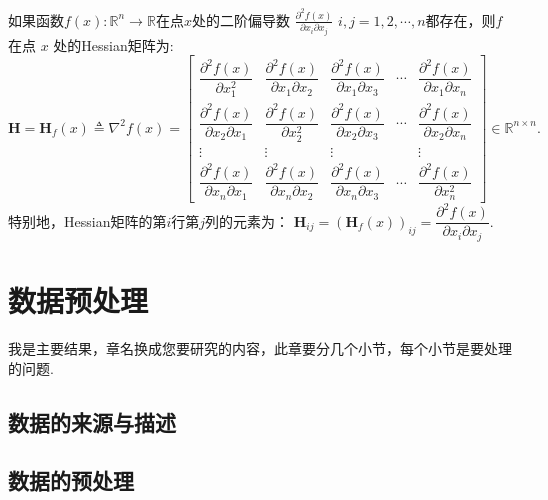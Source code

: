 \begin{definition}[Hessian矩阵]
	如果函数$f(x): \mathbb{R}^n \to \mathbb{R}$在点$x$处的二阶偏导数
		$\frac{\partial^2 f(x)}{\partial x_i \partial x_j}$ $i,j
		=1,2,\cdots,n$都存在，则$f$ 在点 $x$ 处的\textup{Hessian}矩阵为:
		\[ 
		\mathbf{H} = \mathbf{H}_f \left( x\right)  \triangleq \nabla^2 f(x) =
		\begin{bmatrix}
			\dfrac{\partial^2 f(x)}{\partial x_1^2}            & \dfrac{\partial^2 f(x)}{\partial x_1 \partial x_2} & \dfrac{\partial^2 f(x)}{\partial x_1 \partial x_3} & \cdots & \dfrac{\partial^2 f(x)}{\partial x_1 \partial x_n} \\
			\dfrac{\partial^2 f(x)}{\partial x_2 \partial x_1} & \dfrac{\partial^2 f(x)}{\partial x_2^2}            & \dfrac{\partial^2 f(x)}{\partial x_2 \partial x_3} & \cdots & \dfrac{\partial^2 f(x)}{\partial x_2 \partial x_n} \\
			\vdots                                             & \vdots                                             & \vdots                                             &        & \vdots                                             \\
			\dfrac{\partial^2 f(x)}{\partial x_n \partial x_1} & \dfrac{\partial^2 f(x)}{\partial x_n \partial x_2} & \dfrac{\partial^2 f(x)}{\partial x_n \partial x_3} & \cdots & \dfrac{\partial^2 f(x)}{\partial x_n^2}            
		\end{bmatrix}
		 \in \mathbb{R}^{n \times n}.
		\]
		特别地，Hessian矩阵的第$i$行第$j$列的元素为： $ \mathbf{H}_{ij} = \left(\mathbf{H}_f\left( x\right)  \right)_{ij} = \dfrac{\partial^2 f(x)}{\partial x_i \partial x_j}.$
\end{definition}

\chapter{数据预处理}

我是主要结果，章名换成您要研究的内容，此章要分几个小节，每个小节是要处理的问题.

\section{数据的来源与描述}

\section{数据的预处理}

